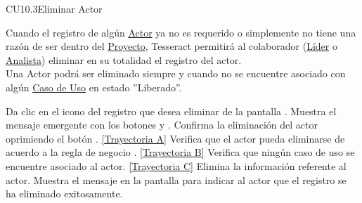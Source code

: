 	\begin{UseCase}{CU10.3}{Eliminar Actor}{
			
		Cuando el registro de algún \hyperlink{actorEntidad}{Actor} ya no es requerido o simplemente no tiene una razón de ser dentro del \hyperlink{proyectoEntidad}{Proyecto}, Tesseract permitirá al colaborador (\hyperlink{jefe}{Líder} o \hyperlink{analista}{Analista}) eliminar en su totalidad el registro del actor. \\
		
		Una Actor podrá ser eliminado siempre y cuando no se encuentre asociado con algún \hyperlink{casoUso}{Caso de Uso} en estado ”Liberado”.	
	}

	\end{UseCase}
	\begin{UCtrayectoria}
		\UCpaso[\UCactor] Da clic en el icono \eliminar del registro que desea eliminar de la pantalla .
		\UCpaso[\UCsist] Muestra el mensaje emergente  con los botones  y .
		\UCpaso[\UCactor] Confirma la eliminación del actor oprimiendo el botón . \hyperlink{CU10-3:TAA}{[Trayectoria A]}
		\UCpaso[\UCsist] Verifica que el actor pueda eliminarse de acuerdo a la regla de negocio . \hyperlink{CU10-3:TAB}{[Trayectoria B]}
		\UCpaso[\UCsist] Verifica que ningún caso de uso se encuentre asociado al actor. \hyperlink{CU10-3:TAC}{[Trayectoria C]}
		\UCpaso[\UCsist] Elimina la información referente al actor.
		\UCpaso[\UCsist] Muestra el mensaje  en la pantalla  para indicar al actor que el registro se ha eliminado exitosamente.
	\end{UCtrayectoria}		
